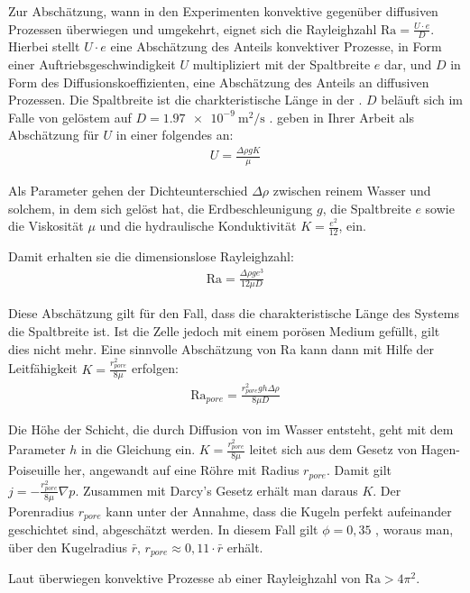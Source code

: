 Zur Abschätzung, wann in den \HSCsm Experimenten konvektive gegenüber diffusiven Prozessen überwiegen und umgekehrt, eignet sich die Rayleighzahl $\mathrm{Ra} = \frac{U \cdot e}{D}$. Hierbei stellt $U \cdot e$ eine Abschätzung des Anteils konvektiver Prozesse, in Form einer Auftriebsgeschwindigkeit $U$ multipliziert mit der Spaltbreite $e$ dar, und $D$ in Form des Diffusionskoeffizienten, eine Abschätzung des Anteils an diffusiven Prozessen. Die Spaltbreite ist die charkteristische Länge in der \HSCn.
$D$ beläuft sich im Falle von gelöstem \COT auf $D = \SI[round-precision=2]{1,97e-9}{\meter\squared\per\second}$ \citep{frank}.
\cite{fernandez} geben in Ihrer Arbeit als Abschätzung für $U$ in einer \HSC folgendes an:
\begin{align}
 U = \frac{\Delta\rho g K}{\mu}
 \label{eq:U}
\end{align}

Als Parameter gehen der Dichteunterschied $\Delta\rho$ zwischen reinem Wasser und solchem, in dem sich \COT gelöst hat, die Erdbeschleunigung $g$, die Spaltbreite $e$ sowie die Viskosität $\mu$ und die hydraulische Konduktivität $K = \frac{e^2}{12}$, ein.

Damit erhalten sie die dimensionslose Rayleighzahl:
\begin{align}
 \mathrm{Ra} = \frac{\Delta\rho g e^3}{12 \mu D}
 \label{eq:Ra1}
\end{align}

Diese Abschätzung gilt für den Fall, dass die charakteristische Länge des Systems die Spaltbreite ist. Ist die Zelle jedoch mit einem porösen Medium gefüllt, gilt dies nicht mehr.
Eine sinnvolle Abschätzung von Ra kann dann mit Hilfe der Leitfähigkeit $K = \frac{r_{pore}^2}{8\mu}$ erfolgen:
\begin{align}
 \mathrm{Ra}_{pore} = \frac{r_{pore}^2 g h \Delta \rho}{8 \mu D}
 \label{eq:Ra2}
\end{align}

Die Höhe der Schicht, die durch Diffusion von \COT im Wasser entsteht, geht mit dem Parameter $h$ in die Gleichung ein.
$K = \frac{r_{pore}^2}{8\mu}$ leitet sich aus dem Gesetz von Hagen-Poiseuille her, angewandt auf eine Röhre mit Radius $r_{pore}$. Damit gilt $j = -\frac{r_{pore}^2}{8\mu} \nabla p$. Zusammen mit Darcy's Gesetz erhält man daraus $K$. Der Porenradius $r_{pore}$ kann unter der Annahme, dass die Kugeln perfekt aufeinander geschichtet sind, abgeschätzt werden. In diesem Fall gilt $\phi=0,35$ \citep{song}, woraus man, über den Kugelradius $\bar{r}$, $r_{pore} \approx 0,11 \cdot \bar{r}$ erhält.


Laut \cite{kneafsy} überwiegen konvektive Prozesse ab einer Rayleighzahl von \mbox{$\mathrm{Ra} > 4\pi^2$}.
